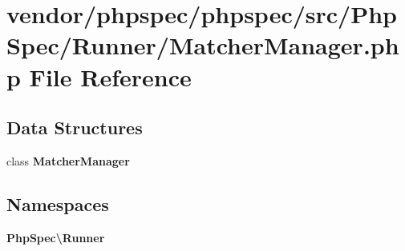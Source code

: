 \section{vendor/phpspec/phpspec/src/\+Php\+Spec/\+Runner/\+Matcher\+Manager.php File Reference}
\label{_matcher_manager_8php}
\subsection*{Data Structures}
\begin{DoxyCompactItemize}
\item 
class {\bf Matcher\+Manager}
\end{DoxyCompactItemize}
\subsection*{Namespaces}
\begin{DoxyCompactItemize}
\item 
 {\bf Php\+Spec\textbackslash{}\+Runner}
\end{DoxyCompactItemize}
